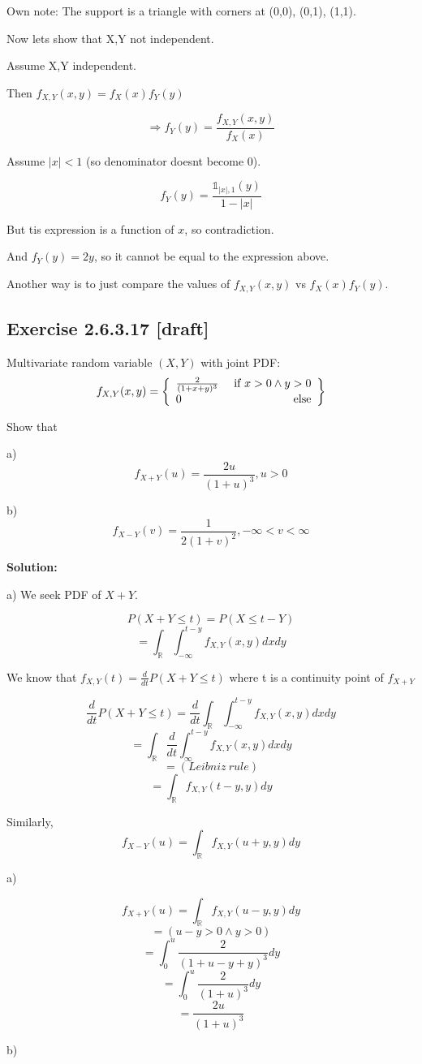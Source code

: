 \documentclass{article}
\begin{document}
Own note: The support is a triangle with corners at (0,0), (0,1), (1,1).

Now lets show that X,Y not independent.

Assume X,Y independent.

Then \(f_{X,Y}(x,y)=f_X(x)f_Y(y)\)

\[\Rightarrow f_Y(y)=\frac{f_{X,Y}(x,y)}{f_X(x)}\]

Assume \(|x|<1\) (so denominator doesnt become 0).

\[f_Y(y)=\frac{\mathds{1}_{|x|, 1}(y)}{1-|x|}\]

But tis expression is a function of \(x\), so contradiction.

And \(f_Y(y)=2y\), so it cannot be equal to the expression above.

Another way is to just compare the values of \(f_{X,Y}(x,y)\) vs \(f_X(x)f_Y(y)\).

\subsection{Exercise 2.6.3.17 [draft]}

Multivariate random variable \((X,Y)\) with joint PDF:
\[f_{X,Y}(x,y)=\left\{\begin{array}{lr}\frac{2}{(1+x+y)^3} & \text{ if }x>0\wedge y>0\\0 & \text{ else}\end{array}\right\}\]

Show that

a)
\[f_{X+Y}(u)=\frac{2u}{(1+u)^3}, u>0\]

b)
\[f_{X-Y}(v)=\frac{1}{2(1+v)^2},-\infty<v<\infty\]

\textbf{Solution:}

a)
We seek PDF of \(X+Y\).

\[P(X+Y\leq t)=P(X\leq t-Y)\]
\[=\int_\mathbb{R}\int_{-\infty}^{t-y} f_{X,Y}(x,y)dxdy\]

We know that \(f_{X,Y}(t)=\frac{d}{dt}P(X+Y\leq t)\)
where t is a continuity point of \(f_{X+Y}\)

\[\frac{d}{dt} P(X+Y\leq t)=\frac{d}{dt}\int_\mathbb{R}\int_{-\infty}^{t-y} f_{X,Y}(x,y)dxdy\]
\[=\int_\mathbb{R} \frac{d}{dt}\int_{\infty}^{t-y} f_{X,Y}(x,y)dxdy\]
\[=(Leibniz\ rule)\]
\[=\int_\mathbb{R} f_{X,Y}(t-y,y)dy\]

Similarly,
\[f_{X-Y}(u)=\int_\mathbb{R} f_{X,Y}(u+y,y)dy\]

a)

\[f_{X+Y}(u) = \int_\mathbb{R} f_{X,Y}(u-y,y)dy\]
\[=(u-y>0 \wedge y>0)\]
\[=\int_0^u \frac{2}{(1+u-y+y)^3}dy\]
\[=\int_0^u \frac{2}{(1+u)^3}dy\]
\[=\frac{2u}{(1+u)^3}\]

b)
\end{document}
